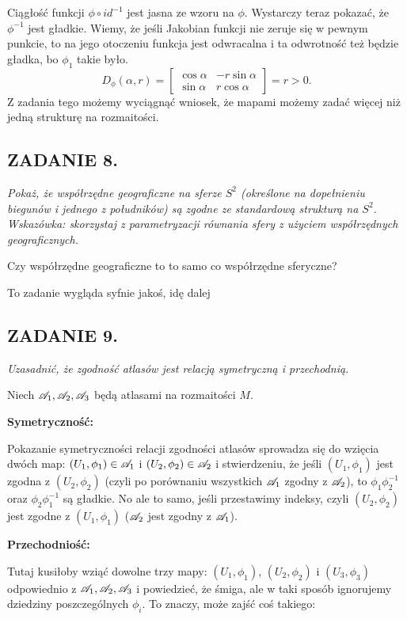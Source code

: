 \documentclass{article}
\begin{document}
Ciągłość funkcji $\phi\circ id^{-1}$ jest jasna ze wzoru na $\phi$. Wystarczy teraz pokazać, że $\phi^{-1}$ jest gładkie. Wiemy, że jeśli Jakobian funkcji nie zeruje się w pewnym punkcie, to na jego otoczeniu funkcja jest odwracalna i ta odwrotność też będzie gładka, bo $\phi_1$ takie było.
$$D_{\phi}(\alpha,r)=\begin{bmatrix}
    \cos\alpha&-r\sin\alpha\\\sin\alpha&r\cos\alpha
\end{bmatrix}=r>0.$$
Z zadania tego możemy wyciągnąć wniosek, że mapami możemy zadać więcej niż jedną strukturę na rozmaitości.

\subsection*{ZADANIE 8.}
\emph{\color{yellow}Pokaż, że współrzędne geograficzne na sferze $S^2$ (określone na dopełnieniu biegunów i jednego z południków) są zgodne ze standardową strukturą na $S^2$. Wskazówka: skorzystaj z parametryzacji równania sfery z użyciem współrzędnych geograficznych.}
\medskip

Czy współrzędne geograficzne to to samo co współrzędne sferyczne?

To zadanie wygląda syfnie jakoś, idę dalej

\subsection*{ZADANIE 9.}
\emph{\color{pink}Uzasadnić, że zgodność atlasów jest relacją symetryczną i przechodnią.}
\medskip

Niech $\mathcal{A}_1,\mathcal{A}_2,\mathcal{A}_3$ będą atlasami na rozmaitości $M$.

\textbf{Symetryczność:}

Pokazanie symetryczności relacji zgodności atlasów sprowadza się do wzięcia dwóch map: $(U_1,\phi_1)\in\mathcal{A}_1$ i $(U_2,\phi_2)\in\mathcal{A}_2$ i stwierdzeniu, że jeśli $(U_1,\phi_1)$ jest zgodna z $(U_2,\phi_2)$ (czyli po porównaniu wszystkich $\mathcal{A}_1$ zgodny z $\mathcal{A}_2$), to $\phi_1\phi_2^{-1}$ oraz $\phi_2\phi_1^{-1}$ są gładkie. No ale to samo, jeśli przestawimy indeksy, czyli $(U_2,\phi_2)$ jest zgodne z $(U_1,\phi_1)$ ($\mathcal{A}_2$ jest zgodny z $\mathcal{A}_1$).

\textbf{Przechodniość:}

Tutaj kusiłoby wziąć dowolne trzy mapy: $(U_1,\phi_1)$, $(U_2,\phi_2)$ i $(U_3,\phi_3)$ odpowiednio z $\mathcal{A}_1,\mathcal{A}_2,\mathcal{A}_3$ i powiedzieć, że śmiga, ale w taki sposób ignorujemy dziedziny poszczególnych $\phi_i$. To znaczy, może zajść coś takiego:
\end{document}
